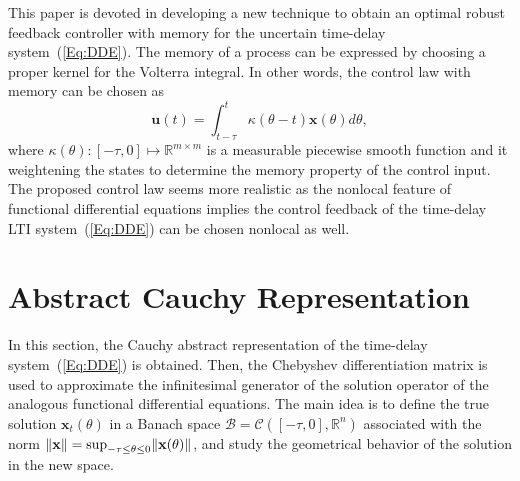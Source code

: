 \documentclass[journal]{IEEEtran}
\DeclarePairedDelimiter{\norm}{\lVert}{\rVert}
\begin{document}
This paper is devoted in developing a new technique to obtain an optimal robust feedback controller with memory for the uncertain time-delay system~(\ref{Eq:DDE}). The memory of a process can be expressed by choosing a proper kernel for the Volterra integral. In other words, the control law with memory can be chosen as
\begin{equation}\label{Eq:feedbackcntrlmemory}
	\mathbf u(t) = \int_{t-\tau}^{t}  \kappa(\theta-t) \mathbf x(\theta) d \theta,
\end{equation}
where $  \kappa(\theta): [-\tau,0] \mapsto \mathbb R ^{m\times m} $ is a measurable piecewise smooth function and it weightening the states to determine  the memory property of the control input. The proposed control law seems more realistic as the nonlocal feature of functional differential equations implies the control feedback of the time-delay LTI system~(\ref{Eq:DDE}) can be chosen nonlocal as well.

\section{Abstract Cauchy Representation} \label{sect:apr}
In this section, the Cauchy abstract representation of the time-delay system~(\ref{Eq:DDE}) is obtained. Then, the Chebyshev differentiation matrix is used to approximate the infinitesimal generator of the solution operator of the analogous functional differential equations. The main idea is to define the true solution $ \mathbf x_t(\theta) $ in a Banach space $ \mathcal B= \mathcal C([-\tau,0], \mathbb R^n) $ associated with the norm $ \norm{\mathbf x}=\operatorname{sup}\limits_{-\tau \leq \theta \leq 0} \norm {\mathbf x(\theta)} $, and study the geometrical behavior of the solution in the new space.
\end{document}
